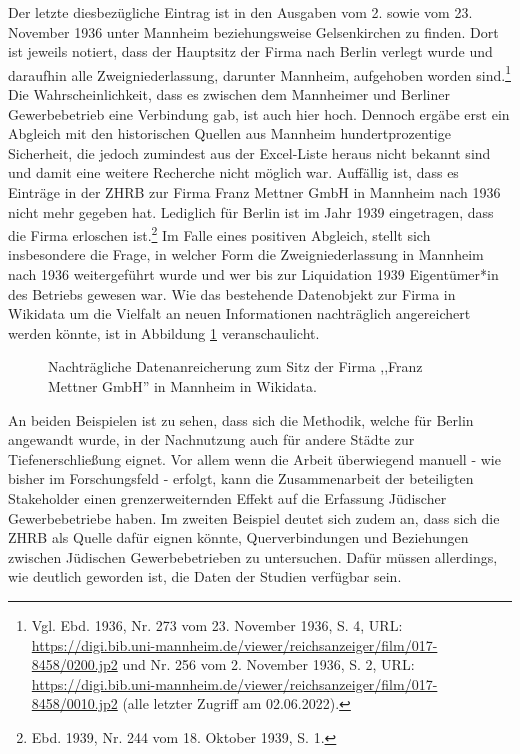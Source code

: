 Der letzte diesbezügliche Eintrag ist in den Ausgaben vom 2. sowie vom 23. November 1936 unter Mannheim beziehungsweise Gelsenkirchen zu finden. Dort ist jeweils notiert, dass der Hauptsitz der Firma nach Berlin verlegt wurde und daraufhin alle Zweigniederlassung, darunter Mannheim, aufgehoben worden sind.\footnote{Vgl. Ebd. 1936, Nr. 273 vom 23. November 1936, S. 4, URL: \url{https://digi.bib.uni-mannheim.de/viewer/reichsanzeiger/film/017-8458/0200.jp2} und Nr. 256 vom 2. November 1936, S. 2, URL: \url{https://digi.bib.uni-mannheim.de/viewer/reichsanzeiger/film/017-8458/0010.jp2} (alle letzter Zugriff am 02.06.2022).} Die Wahrscheinlichkeit, dass es zwischen dem Mannheimer und Berliner Gewerbebetrieb eine Verbindung gab, ist auch hier hoch. Dennoch ergäbe erst ein Abgleich mit den historischen Quellen aus Mannheim hundertprozentige Sicherheit, die jedoch zumindest aus der Excel-Liste heraus nicht bekannt sind und damit eine weitere Recherche nicht möglich war. Auffällig ist, dass es Einträge in der ZHRB zur Firma Franz Mettner GmbH in Mannheim nach 1936 nicht mehr gegeben hat. Lediglich für Berlin ist im Jahr 1939 eingetragen, dass die Firma erloschen ist.\footnote{Ebd. 1939, Nr. 244 vom 18. Oktober 1939, S. 1.} Im Falle eines positiven Abgleich, stellt sich insbesondere die Frage, in welcher Form die Zweigniederlassung in Mannheim nach 1936 weitergeführt wurde und wer bis zur Liquidation 1939 Eigentümer*in des Betriebs gewesen war. Wie das bestehende Datenobjekt zur Firma in Wikidata um die Vielfalt an neuen Informationen nachträglich angereichert werden könnte, ist in Abbildung \ref{fig:wikidatamettner} veranschaulicht. 

\begin{figure}[h]
    \centering
    \caption[Nachträgliche Datenanreicherung in Wikidata]{Nachträgliche Datenanreicherung zum Sitz der Firma ,,Franz Mettner GmbH'' in Mannheim in Wikidata.}
    \label{fig:wikidatamettner}
\end{figure}

An beiden Beispielen ist zu sehen, dass sich die Methodik, welche für Berlin angewandt wurde, in der Nachnutzung auch für andere Städte zur Tiefenerschließung eignet. Vor allem wenn die Arbeit überwiegend manuell - wie bisher im Forschungsfeld - erfolgt, kann die Zusammenarbeit der beteiligten Stakeholder einen grenzerweiternden Effekt auf die Erfassung Jüdischer Gewerbebetriebe haben. Im zweiten Beispiel deutet sich zudem an, dass sich die ZHRB als Quelle dafür eignen könnte, Querverbindungen und Beziehungen zwischen Jüdischen Gewerbebetrieben zu untersuchen. Dafür müssen allerdings, wie deutlich geworden ist, die Daten der Studien verfügbar sein.

